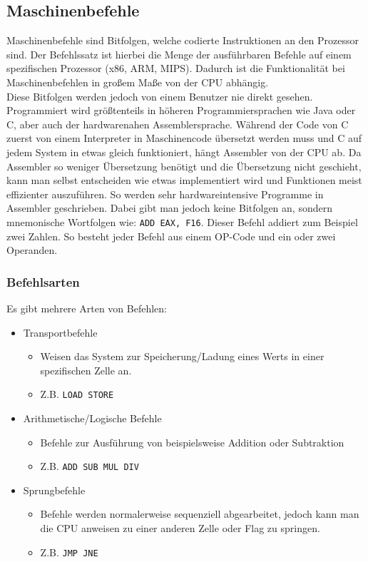 \documentclass{article}
\begin{document}
	\subsection{Maschinenbefehle}
	Maschinenbefehle sind Bitfolgen, welche codierte Instruktionen an den Prozessor sind. Der Befehlssatz ist hierbei die Menge der ausführbaren Befehle auf einem spezifischen Prozessor (x86, ARM, MIPS). Dadurch ist die Funktionalität bei Maschinenbefehlen in großem Maße von der CPU abhängig. \\
	Diese Bitfolgen werden jedoch von einem Benutzer nie direkt gesehen. Programmiert wird größtenteils in höheren Programmiersprachen wie Java oder C, aber auch der hardwarenahen Assemblersprache. Während der Code von C zuerst von einem Interpreter in Maschinencode übersetzt werden muss und C auf jedem System in etwas gleich funktioniert, hängt Assembler von der CPU ab. Da Assembler so weniger Übersetzung benötigt und die Übersetzung nicht geschieht, kann man selbst entscheiden wie etwas implementiert wird und Funktionen meist effizienter auszuführen. So werden sehr hardwareintensive Programme in Assembler geschrieben. Dabei gibt man jedoch keine Bitfolgen an, sondern mnemonische Wortfolgen wie: \verb|ADD EAX, F16|. Dieser Befehl addiert zum Beispiel zwei Zahlen. So besteht jeder Befehl aus einem OP-Code und ein oder zwei Operanden.
	\subsubsection{Befehlsarten}
	Es gibt mehrere Arten von Befehlen: 
	\begin{itemize}
		\item{Transportbefehle}
		\begin{itemize}
			\item{Weisen das System zur Speicherung/Ladung eines Werts in einer spezifischen Zelle an.}
			\item{Z.B. \verb|LOAD STORE| }
		\end{itemize}
		\item{Arithmetische/Logische Befehle}
		\begin{itemize}
			\item{Befehle zur Ausführung von beispielsweise Addition oder Subtraktion}
			\item{Z.B. \verb|ADD SUB MUL DIV| }
		\end{itemize}
		\item{Sprungbefehle}
		\begin{itemize}
			\item{Befehle werden normalerweise sequenziell abgearbeitet, jedoch kann man die CPU anweisen zu einer anderen Zelle oder Flag zu springen.}
			\item{Z.B. \verb|JMP JNE| }
		\end{itemize}
	\end{itemize}
\end{document}
